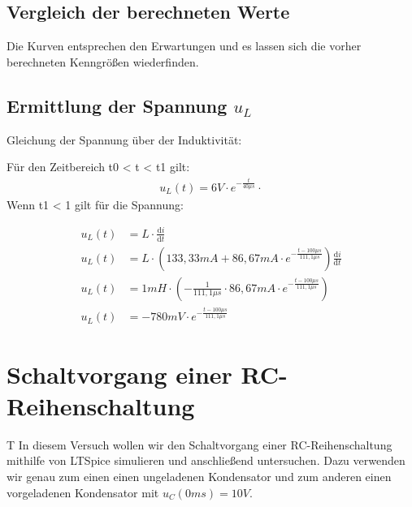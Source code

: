 \documentclass{article}
\begin{document}
\subsection{Vergleich der berechneten Werte}

Die Kurven entsprechen den Erwartungen und es lassen sich die vorher berechneten Kenngrößen wiederfinden.

\subsection{Ermittlung der Spannung $u_L$}

Gleichung der Spannung über der Induktivität:

Für den Zeitbereich t0 < t < t1 gilt:
\begin{align*}
  u_L(t) = 6V\cdot e^{-\frac{t}{40\mu s}}\cdot 
\end{align*}
Wenn t1 < 1 gilt für die Spannung:

\begin{align*}
  u_L(t) &= L\cdot \frac{\mathrm{d} i}{\mathrm{d} t}\\
  u_L(t) &= L\cdot (133,33mA + 86,67mA\cdot e^{-\frac{t-100\mu s}{111,1\mu s}})\frac{\mathrm{d} i}{\mathrm{d} t}\\
  u_L(t) &= 1mH\cdot \left(-\frac{1}{111,1\mu s}\cdot 86,67mA\cdot e^{-\frac{t-100\mu s}{111,1\mu s}}\right)\\
  u_L(t) &= -780mV\cdot e^{-\frac{t-100\mu s}{111,1\mu s}}
\end{align*}
\newpage

\section{Schaltvorgang einer RC-Reihenschaltung}

\begin{task}
  T
  In diesem Versuch wollen wir den Schaltvorgang einer RC-Reihenschaltung mithilfe von LTSpice simulieren und anschließend untersuchen. Dazu verwenden wir genau zum einen einen ungeladenen Kondensator und zum anderen einen vorgeladenen Kondensator mit $u_{C}(0ms) = 10V$.
\end{task}
\end{document}
